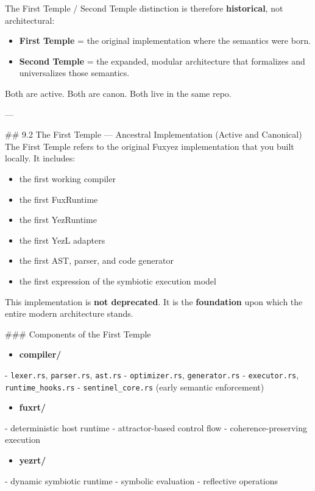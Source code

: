 \begin{enumerate}
The First Temple / Second Temple distinction is therefore \textbf{historical}, not architectural:

\begin{itemize}
  \item \textbf{First Temple} = the original implementation where the semantics were born.  
  \item \textbf{Second Temple} = the expanded, modular architecture that formalizes and universalizes those semantics.  
\end{itemize}

Both are active. Both are canon. Both live in the same repo.

---

\#\# 9.2 The First Temple — Ancestral Implementation (Active and Canonical)  
The First Temple refers to the original Fuxyez implementation that you built locally. It includes:

\begin{itemize}
  \item the first working compiler  
  \item the first FuxRuntime  
  \item the first YezRuntime  
  \item the first YezL adapters  
  \item the first AST, parser, and code generator  
  \item the first expression of the symbiotic execution model  
\end{itemize}

This implementation is \textbf{not deprecated}. It is the \textbf{foundation} upon which the entire modern architecture stands.

\#\#\# Components of the First Temple  
\begin{itemize}
  \item \textbf{compiler/}  
\end{itemize}
  - \texttt{lexer.rs}, \texttt{parser.rs}, \texttt{ast.rs}  
  - \texttt{optimizer.rs}, \texttt{generator.rs}  
  - \texttt{executor.rs}, \texttt{runtime_hooks.rs}  
  - \texttt{sentinel_core.rs} (early semantic enforcement)  

\begin{itemize}
  \item \textbf{fuxrt/}  
\end{itemize}
  - deterministic host runtime  
  - attractor-based control flow  
  - coherence-preserving execution  

\begin{itemize}
  \item \textbf{yezrt/}  
\end{itemize}
  - dynamic symbiotic runtime  
  - symbolic evaluation  
  - reflective operations  


\end{enumerate}
